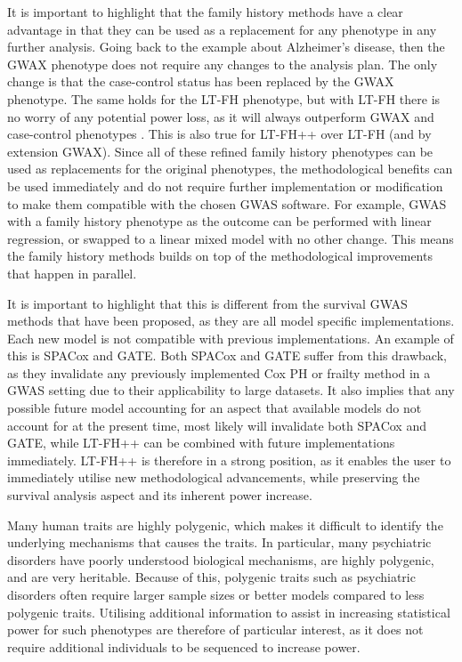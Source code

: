 It is important to highlight that the family history methods have a clear advantage in that they can be used as a replacement for any phenotype in any further analysis. Going back to the example about Alzheimer's disease, then the GWAX phenotype does not require any changes to the analysis plan. The only change is that the case-control status has been replaced by the GWAX phenotype. The same holds for the LT-FH phenotype, but with LT-FH there is no worry of any potential power loss, as it will always outperform GWAX and case-control phenotypes \cite{hujoel2020liability,pedersen2022accounting}. This is also true for LT-FH++ over LT-FH (and by extension GWAX). Since all of these refined family history phenotypes can be used as replacements for the original phenotypes, the methodological benefits can be used immediately and do not require further implementation or modification to make them compatible with the chosen GWAS software. For example, GWAS with a family history phenotype as the outcome can be performed with linear regression, or swapped to a linear mixed model with no other change. This means the family history methods builds on top of the methodological improvements that happen in parallel.

It is important to highlight that this is different from the survival GWAS methods that have been proposed, as they are all model specific implementations\cite{dey2022efficient,bi2020fast,Therneau2020-xf}. Each new model is not compatible with previous implementations. An example of this is SPACox and GATE. Both SPACox and GATE suffer from this drawback, as they invalidate any previously implemented Cox PH or frailty method in a GWAS setting due to their applicability to large datasets. It also implies that any possible future model accounting for an aspect that available models do not account for at the present time, most likely will invalidate both SPACox and GATE, while LT-FH++ can be combined with future implementations immediately. LT-FH++ is therefore in a strong position, as it enables the user to immediately utilise new methodological advancements, while preserving the survival analysis aspect and its inherent power increase.    

Many human traits are highly polygenic, which makes it difficult to identify the underlying mechanisms that causes the traits\cite{song2021selection}. In particular, many psychiatric disorders have poorly understood biological mechanisms, are highly polygenic, and are very heritable\cite{pardinas2018common,esteller2020genomic}. Because of this, polygenic traits such as psychiatric disorders often require larger sample sizes or better models compared to less polygenic traits\cite{han2008genome,bergen2012genome,badano2002beyond}. Utilising additional information to assist in increasing statistical power for such phenotypes are therefore of particular interest, as it does not require additional individuals to be sequenced to increase power.



